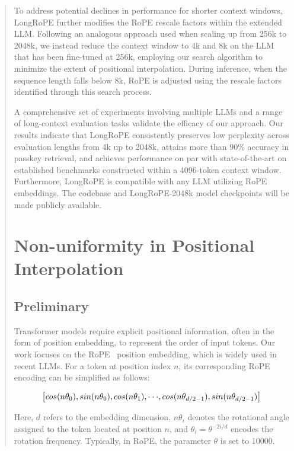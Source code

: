 \begin{abstract}
To address potential declines in performance for shorter context windows, {LongRoPE} further modifies the RoPE rescale factors within the extended LLM. Following an analogous approach used when scaling up from 256k to 2048k, we instead reduce the context window to 4k and 8k on the LLM that has been fine-tuned at 256k, employing our search algorithm to minimize the extent of positional interpolation. During inference, when the sequence length falls below 8k, RoPE is adjusted using the rescale factors identified through this search process.

A comprehensive set of experiments involving multiple LLMs and a range of long-context evaluation tasks validate the efficacy of our approach. Our results indicate that LongRoPE consistently preserves low perplexity across evaluation lengths from 4k up to 2048k, attains more than 90\% accuracy in passkey retrieval, and achieves performance on par with state-of-the-art on established benchmarks constructed within a 4096-token context window. Furthermore, LongRoPE is compatible with any LLM utilizing RoPE embeddings. The codebase and LongRoPE-2048k model checkpoints will be made publicly available.

\section{Non-uniformity in Positional Interpolation}
\label{sec:analysis}

\subsection{Preliminary}

Transformer models require explicit positional information, often in the form of position embedding, to represent the order of input tokens. Our work focuses on the RoPE~\cite{rope} position embedding, which is widely used in recent  LLMs. For a token at position index $n$, its corresponding RoPE encoding can be simplified as follows:

\begin{equation}
		\fontsize{7.8}{7.8} \selectfont
	\label{eq:rope}
	\left[ cos(n\theta_0), sin(n\theta_0), cos(n\theta_1), \cdot\cdot\cdot, cos(n\theta_{d/2-1}), sin(n\theta_{d/2-1}) \right]   
\end{equation}

Here, $d$ refers to the embedding dimension, $n\theta_i$ denotes the rotational angle assigned to the token located at position $n$, and $\theta_i=\theta^{-2i/d}$ encodes the rotation frequency. Typically, in RoPE, the parameter $\theta$ is set to 10000.


\end{abstract}

